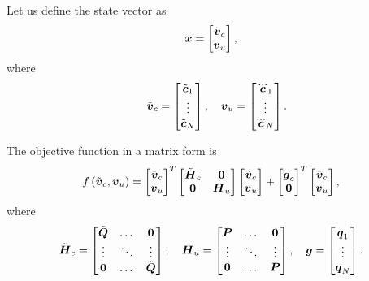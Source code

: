 Let us define the state vector as
$$
\mbox{\boldmath $x$} = \begin{bmatrix} \tilde{\mbox{\boldmath $v$}}_c \\ \mbox{\boldmath $v$}_u \end{bmatrix},
$$
where
$$
\quad
\tilde{\mbm{v}}_c = \begin{bmatrix} \tilde{\mbm{c}}_1 \\ \vdots \\ \tilde{\mbm{c}}_N \end{bmatrix} , \quad
\mbm{v}_u = \begin{bmatrix} \dddot{\mbm{c}}_1 \\ \vdots \\ \dddot{\mbm{c}}_N \end{bmatrix} .
$$

The objective function in a matrix form is
$$
f\left(\tilde{\mbox{\boldmath $v$}}_c, \mbox{\boldmath $v$}_u\right) =
\begin{bmatrix} \tilde{\mbox{\boldmath $v$}}_c \\ \mbox{\boldmath $v$}_u \end{bmatrix}^T
\begin{bmatrix} 
    \tilde{\mbox{\boldmath $H$}}_c   & \mbox{\boldmath $0$} \\ 
    \mbox{\boldmath $0$}             & \mbox{\boldmath $H$}_u \\
\end{bmatrix}
\begin{bmatrix} \tilde{\mbox{\boldmath $v$}}_c \\ \mbox{\boldmath $v$}_u \end{bmatrix}
+
\begin{bmatrix} \mbox{\boldmath $g$}_c \\ \mbox{\boldmath $0$} \end{bmatrix}^T
\begin{bmatrix} \tilde{\mbox{\boldmath $v$}}_c \\ \mbox{\boldmath $v$}_u \end{bmatrix},
$$
where
$$
\tilde{\mbm{H}}_c =
  \begin{bmatrix}
    \tilde{\mbm{Q}} & \dots  & \mbm{0} \\ 
    \vdots  & \ddots & \vdots  \\ 
    \mbm{0} & \dots  & \tilde{\mbm{Q}} \\ 
  \end{bmatrix}, \quad
%
\mbm{H}_u = 
  \begin{bmatrix}
    \mbm{P} & \dots  & \mbm{0} \\ 
    \vdots  & \ddots & \vdots  \\ 
    \mbm{0} & \dots  & \mbm{P} \\ 
  \end{bmatrix}, \quad
%
\mbm{g} = 
\begin{bmatrix} \mbm{q}_1 \\ \vdots \\ \mbm{q}_N \end{bmatrix} .
$$

